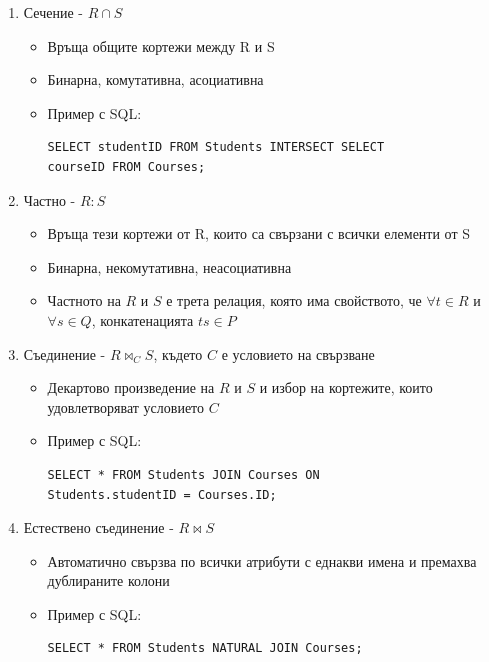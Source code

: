 \documentclass{article}
\begin{document}
\begin{enumerate}
    \item Сечение - $R \cap S$
        \begin{itemize}
            \item Връща общите кортежи между R и S
            \item Бинарна, комутативна, асоциативна
            \item Пример с SQL:
\begin{lstlisting}[style=sql]
SELECT studentID FROM Students INTERSECT SELECT
courseID FROM Courses;
\end{lstlisting}
        \end{itemize}
    \item Частно - $R : S$
        \begin{itemize}
            \item Връща тези кортежи от R, които са свързани с всички елементи от S
            \item Бинарна, некомутативна, неасоциативна
            \item Частното на $R$ и $S$ е трета релация, която има свойството, че $\forall t \in R$ и $\forall s \in Q$, конкатенацията $ts \in P$
        \end{itemize}
    \item Съединение - $R \bowtie_C S$, където $C$ е условието на свързване
        \begin{itemize}
            \item Декартово произведение на $R$ и $S$ и избор на кортежите, които удовлетворяват условието $C$
            \item Пример с SQL:
\begin{lstlisting}[style=sql]
SELECT * FROM Students JOIN Courses ON
Students.studentID = Courses.ID;
\end{lstlisting}
        \end{itemize}
    \item Естествено съединение - $R \bowtie S$
        \begin{itemize}
            \item Автоматично свързва по всички атрибути с еднакви имена и премахва дублираните колони
            \item Пример с SQL:
\begin{lstlisting}[style=sql]
SELECT * FROM Students NATURAL JOIN Courses;
\end{lstlisting}
        \end{itemize}
\end{enumerate}
\end{document}
